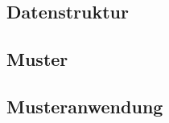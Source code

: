 \subsection{Datenstruktur}

\subsection{Muster} \label{subsecCppMuster}

\subsection{Musteranwendung} \label{subsecCppMusterAnwendung}

















